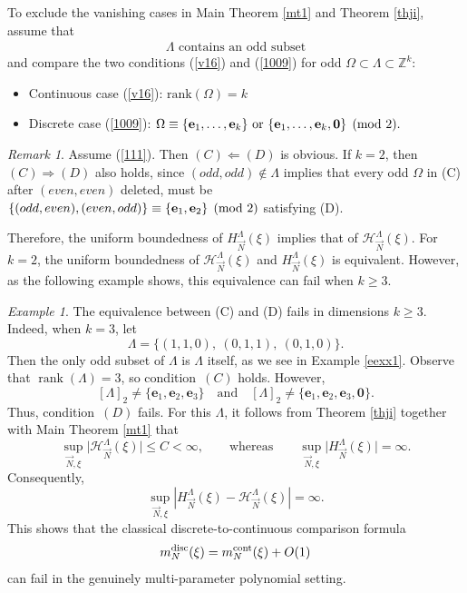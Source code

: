 \documentclass[11 pt,letterpaper]{amsart}
\theoremstyle{plain}
\theoremstyle{definition}
\theoremstyle{remark} \theoremstyle{exam} \theoremstyle{ob}
\newtheorem{remark}{Remark}\numberwithin{remark}{section}
\newtheorem{exam}{Example}\numberwithin{exam}{section}
\numberwithin{equation}{section}
\begin{document}
To exclude  the vanishing cases in Main Theorem \ref{mt1} and Theorem \ref{thji},  assume that
\begin{align}\label{111}
	\Lambda \text{ contains an odd subset}
\end{align}
and
compare the two conditions (\ref{v16}) and (\ref{1009}) for  odd   $\Omega\subset \Lambda\subset \mathbb{Z}^k$:
\begin{itemize}
	\item[(C)]  Continuous case (\ref{v16}):   $\text{rank}(\Omega)=k$ 
	\item[(D)] Discrete case (\ref{1009}):    $\Omega \equiv
	\{{\bf e}_1,\dots,{\bf e}_k\}\ \text{or}\ \{{\bf e}_1,\dots,{\bf e}_k, {\bf 0}\}
	\pmod 2.$
\end{itemize}
\begin{remark}\label{rk423}
	Assume   (\ref{111}). Then   $  (C)\Leftarrow  (D) $ is obvious.
	If $k=2$, then $ (C)\Rightarrow (D)$  also holds,  since  $(odd,odd)\notin \Lambda$ implies that  every odd $\Omega$ in  (C) after  $(even,even)$ deleted,  must be $\{(odd,even),(even,odd)\}  \equiv
	\{{\bf e}_1, {\bf e}_2\}
	\pmod 2 $ satisfying (D).  
\end{remark}
Therefore, the uniform boundedness of $H^{\Lambda}_{\vec{N}}(\xi)$ implies that of $\mathcal{H}^{\Lambda}_{\vec{N}}(\xi)$. 
For $k=2$, the uniform boundedness of $\mathcal{H}^{\Lambda}_{\vec{N}}(\xi)$ and $H^{\Lambda}_{\vec{N}}(\xi)$ is equivalent. 
However, as the following example shows, this equivalence can fail
when $k\ge 3$.
\begin{exam}
	The equivalence between {\rm(C)} and {\rm(D)} fails in dimensions
	$k\ge3$. Indeed, when $k=3$, let 
	\[
	\Lambda=\{(1,1,0),\ (0,1,1),\ (0,1,0)\}.
	\]
	Then the only odd subset of $\Lambda$ is $\Lambda$ itself, as we see in Example \ref{eexx1}. Observe that $\operatorname{rank}(\Lambda)=3$, so condition~$(C)$
	holds. However,
	\[
	[\Lambda]_2
	\neq
	\{\mathbf e_1,\mathbf e_2,\mathbf e_3\}
	\quad\text{and}\quad
	[\Lambda]_2
	\neq
	\{\mathbf e_1,\mathbf e_2,\mathbf e_3,\mathbf 0\}.
	\]
	Thus, condition~$(D)$ fails.
	For this $\Lambda$, it follows from Theorem \ref{thji} together with  Main Theorem \ref{mt1} that  
	\[
	\sup_{\vec{N},\xi} \bigl| \mathcal{H}^{\Lambda}_{\vec{N}}(\xi) \bigr| \le C < \infty, 
	\qquad\text{whereas}\qquad  \sup_{\vec{N},\xi} \bigl| H^{\Lambda}_{\vec{N}}(\xi) \bigr|=\infty.
	\]
	Consequently,
	\[
	\sup_{\vec N,\xi}
	\left|
	H^\Lambda_{\vec N}(\xi)
	-
	\mathcal H^\Lambda_{\vec N}(\xi)
	\right|
	=\infty.
	\]
	This shows that the classical discrete-to-continuous comparison formula
	\[
	m_N^{\rm disc}(\xi)
	=
	m_N^{\rm cont}(\xi)+O(1)
	\]
can	fail in the genuinely multi-parameter polynomial setting.
\end{exam}
\end{document}
